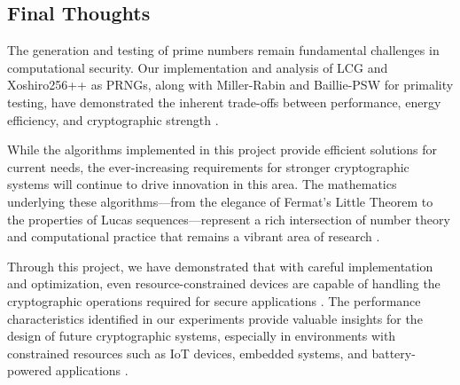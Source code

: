 \subsection{Final Thoughts}

The generation and testing of prime numbers remain fundamental challenges in computational security. Our implementation and analysis of LCG and Xoshiro256++ as PRNGs, along with Miller-Rabin and Baillie-PSW for primality testing, have demonstrated the inherent trade-offs between performance, energy efficiency, and cryptographic strength \cite{knuth1997, blackman2019, miller1976, baillie1980}.

While the algorithms implemented in this project provide efficient solutions for current needs, the ever-increasing requirements for stronger cryptographic systems will continue to drive innovation in this area. The mathematics underlying these algorithms—from the elegance of Fermat's Little Theorem to the properties of Lucas sequences—represent a rich intersection of number theory and computational practice that remains a vibrant area of research \cite{pomerance2001, primality_survey}.

Through this project, we have demonstrated that with careful implementation and optimization, even resource-constrained devices are capable of handling the cryptographic operations required for secure applications \cite{resource_constrained, embedded_crypto}. The performance characteristics identified in our experiments provide valuable insights for the design of future cryptographic systems, especially in environments with constrained resources such as IoT devices, embedded systems, and battery-powered applications \cite{iot_survey, energy_efficient, energy_prng}. 
